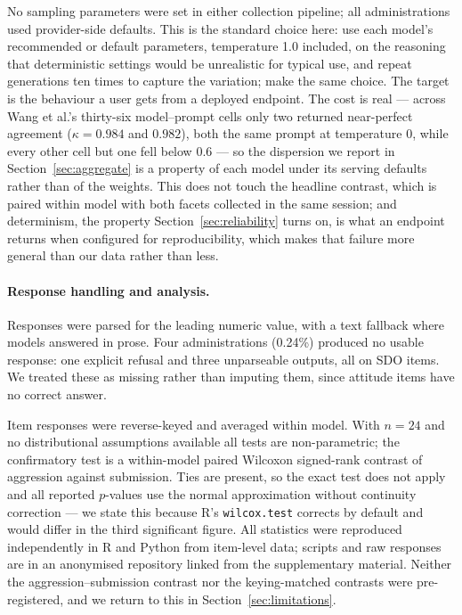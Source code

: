 \documentclass{article}
\begin{document}
No sampling parameters were set in either collection pipeline; all administrations used provider-side defaults. This is the standard choice here: \citet{einwiller2026} use each model's recommended or default parameters, temperature 1.0 included, on the reasoning that deterministic settings would be unrealistic for typical use, and repeat generations ten times to capture the variation; \citet{urban2025} make the same choice. The target is the behaviour a user gets from a deployed endpoint. The cost is real --- across Wang et al.'s thirty-six model--prompt cells only two returned near-perfect agreement ($\kappa = 0.984$ and $0.982$), both the same prompt at temperature 0, while every other cell but one fell below $0.6$ --- so the dispersion we report in Section~\ref{sec:aggregate} is a property of each model under its serving defaults rather than of the weights. This does not touch the headline contrast, which is paired within model with both facets collected in the same session; and determinism, the property Section~\ref{sec:reliability} turns on, is what an endpoint returns when configured for reproducibility, which makes that failure more general than our data rather than less.

\paragraph{Response handling and analysis.} Responses were parsed for the leading numeric value, with a text fallback where models answered in prose. Four administrations (0.24\%) produced no usable response: one explicit refusal and three unparseable outputs, all on SDO items. We treated these as missing rather than imputing them, since attitude items have no correct answer.

Item responses were reverse-keyed and averaged within model. With $n = 24$ and no distributional assumptions available all tests are non-parametric; the confirmatory test is a within-model paired Wilcoxon signed-rank contrast of aggression against submission. Ties are present, so the exact test does not apply and all reported $p$-values use the normal approximation without continuity correction --- we state this because R's \texttt{wilcox.test} corrects by default and would differ in the third significant figure. All statistics were reproduced independently in R and Python from item-level data; scripts and raw responses are in an anonymised repository linked from the supplementary material. Neither the aggression--submission contrast nor the keying-matched contrasts were pre-registered, and we return to this in Section~\ref{sec:limitations}.
\end{document}
